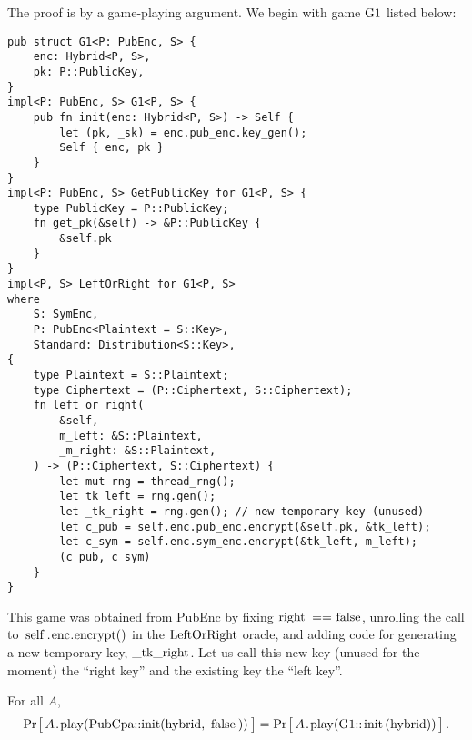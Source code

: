 The proof is by a game-playing argument.
%
We begin with game $\code{G1}$ listed below:

\begin{lstlisting}
pub struct G1<P: PubEnc, S> {
    enc: Hybrid<P, S>,
    pk: P::PublicKey,
}
impl<P: PubEnc, S> G1<P, S> {
    pub fn init(enc: Hybrid<P, S>) -> Self {
        let (pk, _sk) = enc.pub_enc.key_gen();
        Self { enc, pk }
    }
}
impl<P: PubEnc, S> GetPublicKey for G1<P, S> {
    type PublicKey = P::PublicKey;
    fn get_pk(&self) -> &P::PublicKey {
        &self.pk
    }
}
impl<P, S> LeftOrRight for G1<P, S>
where
    S: SymEnc,
    P: PubEnc<Plaintext = S::Key>,
    Standard: Distribution<S::Key>,
{
    type Plaintext = S::Plaintext;
    type Ciphertext = (P::Ciphertext, S::Ciphertext);
    fn left_or_right(
        &self,
        m_left: &S::Plaintext,
        _m_right: &S::Plaintext,
    ) -> (P::Ciphertext, S::Ciphertext) {
        let mut rng = thread_rng();
        let tk_left = rng.gen();
        let _tk_right = rng.gen(); // new temporary key (unused)
        let c_pub = self.enc.pub_enc.encrypt(&self.pk, &tk_left);
        let c_sym = self.enc.sym_enc.encrypt(&tk_left, m_left);
        (c_pub, c_sym)
    }
}
\end{lstlisting}
%
This game was obtained from \hyperref[fig/pubenc/security]{PubEnc} by fixing
$\code{right == false}$, unrolling the call to $\code{self.enc.encrypt()}$ in
the $\code{LeftOrRight}$ oracle, and adding code for generating a new temporary
key, $\code{_tk_right}$. Let us call this new key (unused for the moment) the
``right key'' and the existing key the ``left key''.
%
\begin{claim}
  For all $A$,
  \[
     \Prob{A\code{.play(PubCpa::init(hybrid, false))}} =
     \Prob{A\code{.play(G1::init(hybrid))}} \,.
  \]
\end{claim}
%

